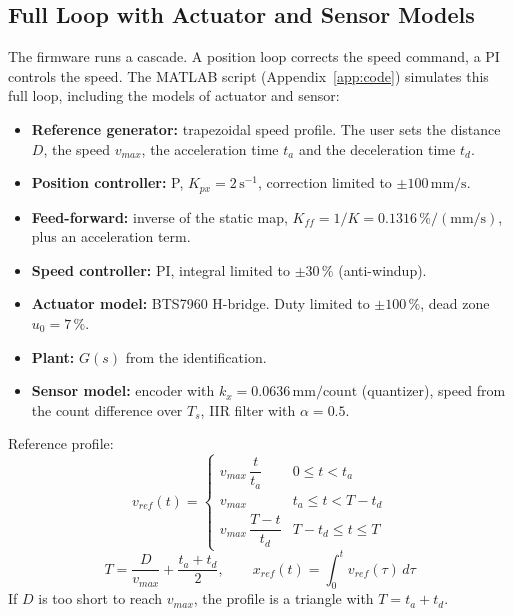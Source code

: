 \documentclass[11pt,a4paper]{article}
\begin{document}
\subsection{Full Loop with Actuator and Sensor Models}\label{sec:fullloop}
The firmware runs a cascade.
A position loop corrects the speed command, a PI controls the speed.
The MATLAB script (Appendix~\ref{app:code}) simulates this full loop,
including the models of actuator and sensor:

\begin{itemize}
  \item \textbf{Reference generator:} trapezoidal speed profile.
        The user sets the distance \(D\), the speed \(v_{max}\),
        the acceleration time \(t_a\) and the deceleration time \(t_d\).
  \item \textbf{Position controller:} P, \(K_{px} = 2\,\mathrm{s^{-1}}\),
        correction limited to \(\pm 100\,\mathrm{mm/s}\).
  \item \textbf{Feed-forward:} inverse of the static map, \(K_{ff} = 1/K = 0.1316\,\%/(\mathrm{mm/s})\),
        plus an acceleration term.
  \item \textbf{Speed controller:} PI, integral limited to \(\pm 30\,\%\) (anti-windup).
  \item \textbf{Actuator model:} BTS7960 H-bridge. Duty limited to \(\pm 100\,\%\), dead zone \(u_0 = 7\,\%\).
  \item \textbf{Plant:} \(G(s)\) from the identification.
  \item \textbf{Sensor model:} encoder with \(k_x = 0.0636\,\mathrm{mm/count}\) (quantizer),
        speed from the count difference over \(T_s\), IIR filter with \(\alpha = 0.5\).
\end{itemize}

Reference profile:
\begin{equation}
  v_{ref}(t) =
  \begin{cases}
    v_{max}\,\dfrac{t}{t_a}       & 0 \le t < t_a \\[4pt]
    v_{max}                        & t_a \le t < T - t_d \\[4pt]
    v_{max}\,\dfrac{T - t}{t_d}   & T - t_d \le t \le T
  \end{cases}
\end{equation}
\begin{equation}
  T = \frac{D}{v_{max}} + \frac{t_a + t_d}{2},
  \qquad
  x_{ref}(t) = \int_0^t v_{ref}(\tau)\,d\tau
\end{equation}
If \(D\) is too short to reach \(v_{max}\), the profile is a triangle with
\(T = t_a + t_d\).
\end{document}
